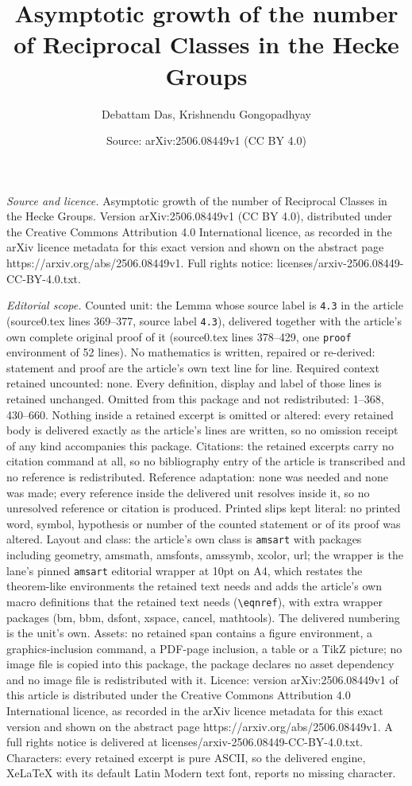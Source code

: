 \documentclass[10pt,a4paper]{amsart}
\title[Asymptotic growth of the number of Reciprocal Classes in the]{Asymptotic growth of the number of Reciprocal Classes in the Hecke Groups}
\author{Debattam Das, Krishnendu Gongopadhyay}
\date{Source: arXiv:2506.08449v1 (CC BY 4.0)}
\begin{document}
\maketitle

\noindent\emph{Source and licence.} Asymptotic growth of the number of Reciprocal Classes in the Hecke Groups. Version arXiv:2506.08449v1 (CC BY 4.0), distributed under the Creative Commons Attribution 4.0 International licence, as recorded in the arXiv licence metadata for this exact version and shown on the abstract page https://arxiv.org/abs/2506.08449v1. Full rights notice: licenses/arxiv-2506.08449-CC-BY-4.0.txt.\par\smallskip

\noindent\textit{Editorial scope.} Counted unit: the Lemma whose source label is \texttt{4.3} in the article (source0.tex lines 369--377, source label \texttt{4.3}), delivered together with the article's own complete original proof of it (source0.tex lines 378--429, one \texttt{proof} environment of 52 lines). No mathematics is written, repaired or re-derived: statement and proof are the article's own text line for line. Required context retained uncounted: none. Every definition, display and label of those lines is retained unchanged. Omitted from this package and not redistributed: 1--368, 430--660. Nothing inside a retained excerpt is omitted or altered: every retained body is delivered exactly as the article's lines are written, so no omission receipt of any kind accompanies this package. Citations: the retained excerpts carry no citation command at all, so no bibliography entry of the article is transcribed and no reference is redistributed. Reference adaptation: none was needed and none was made; every reference inside the delivered unit resolves inside it, so no unresolved reference or citation is produced. Printed slips kept literal: no printed word, symbol, hypothesis or number of the counted statement or of its proof was altered. Layout and class: the article's own class is \texttt{amsart} with packages including geometry, amsmath, amsfonts, amssymb, xcolor, url; the wrapper is the lane's pinned \texttt{amsart} editorial wrapper at 10pt on A4, which restates the theorem-like environments the retained text needs and adds the article's own macro definitions that the retained text needs (\texttt{\textbackslash eqnref}), with extra wrapper packages (bm, bbm, dsfont, xspace, cancel, mathtools). The delivered numbering is the unit's own. Assets: no retained span contains a figure environment, a graphics-inclusion command, a PDF-page inclusion, a table or a TikZ picture; no image file is copied into this package, the package declares no asset dependency and no image file is redistributed with it. Licence: version arXiv:2506.08449v1 of this article is distributed under the Creative Commons Attribution 4.0 International licence, as recorded in the arXiv licence metadata for this exact version and shown on the abstract page https://arxiv.org/abs/2506.08449v1. A full rights notice is delivered at licenses/arxiv-2506.08449-CC-BY-4.0.txt. Characters: every retained excerpt is pure ASCII, so the delivered engine, XeLaTeX with its default Latin Modern text font, reports no missing character.
\end{document}
